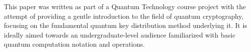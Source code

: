 This paper was written as part of a Quantum Technology course project with the attempt of providing a gentle introduction 
to the field of quantum cryptography, focusing on the fundamental quantum key distribution method underlying it. 
It is ideally aimed towards an undergraduate-level audience familiarized with basic quantum computation notation and operations.


